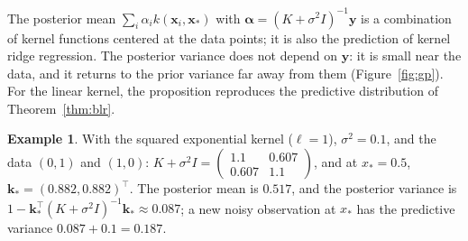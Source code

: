 \documentclass[11pt]{article}
\theoremstyle{definition}
\newtheorem{example}[definition]{Example}
\theoremstyle{plain}
\theoremstyle{remark}
\begin{document}
The posterior mean $\sum_i \alpha_i k(\mathbf{x}_i, \mathbf{x}_*)$ with $\boldsymbol{\alpha} = (K + \sigma^2 I)^{-1}\mathbf{y}$ is a combination of kernel functions centered at the data points; it is also the prediction of kernel ridge regression. The posterior variance does not depend on $\mathbf{y}$: it is small near the data, and it returns to the prior variance far away from them (Figure~\ref{fig:gp}). For the linear kernel, the proposition reproduces the predictive distribution of Theorem~\ref{thm:blr}.

\begin{example}\label{ex:gp}
    With the squared exponential kernel ($\ell = 1$), $\sigma^2 = 0.1$, and the data $(0, 1)$ and $(1, 0)$: $K + \sigma^2 I = \begin{pmatrix} 1.1 & 0.607 \\ 0.607 & 1.1 \end{pmatrix}$, and at $x_* = 0.5$, $\mathbf{k}_* = (0.882, 0.882)^\top$. The posterior mean is $0.517$, and the posterior variance is $1 - \mathbf{k}_*^\top(K + \sigma^2 I)^{-1}\mathbf{k}_* \approx 0.087$; a new noisy observation at $x_*$ has the predictive variance $0.087 + 0.1 = 0.187$.
\end{example}
\end{document}
